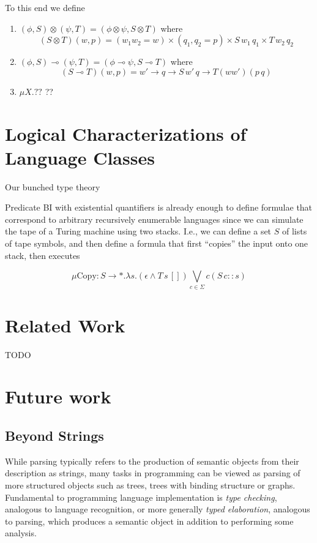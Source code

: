 \documentclass[sigconf,anonymous,review,screen]{acmart}
\newif\ifdraft
\newcommand{\pedro}[1]{\ifdraft{\color{red}[{\bf Pedro}: #1]}\fi}
\begin{document}
To this end we define
\pedro{I'm pretty sure that these definitions have been somewhat presented
  in ``Glueing and orthogonality for models of linear logic'' by Hyland and Schalk.
We should probably cite them so that we don't have to rederive their constructions and proofs here.}
\begin{enumerate}
\item $(\phi, S) \otimes (\psi, T) = (\phi \otimes \psi, S\otimes T)$ where
  \[ (S \otimes T)(w, p) = (w_1w_2 = w) \times (q_1,q_2 = p) \times S\,w_1\,q_1 \times T\,w_2\,q_2\]
\item $(\phi, S) \multimap (\psi, T) = (\phi \multimap \psi, S \multimap T)$ where
  \[ (S \multimap T)(w,p) = w' \to q \to S\,w'\,q \to T (ww') (p\,q) \]
\item $\mu X. ??$ ??
\end{enumerate}

\section{Logical Characterizations of Language Classes}

Our bunched type theory 

Predicate BI with existential quantifiers is already enough to define
formulae that correspond to arbitrary recursively enumerable languages
since we can simulate the tape of a Turing machine using two
stacks. I.e., we can define a set $S$ of lists of tape symbols, and
then define a formula that first ``copies'' the input onto one stack, then executes

\[ \mu \textrm{Copy} : S \to *. \lambda s. (\epsilon \wedge T\,s\,[])\bigvee_{c \in \Sigma} c (S\,{c::s}) \]


\section{Related Work}

TODO 


\section{Future work}

\subsection{Beyond Strings}

While parsing typically refers to the production of semantic objects
from their description as strings, many tasks in programming can be
viewed as parsing of more structured objects such as trees, trees with
binding structure or graphs. Fundamental to programming language
implementation is \emph{type checking}, analogous to language
recognition, or more generally \emph{typed elaboration}, analogous to
parsing, which produces a semantic object in addition to performing
some analysis.
\end{document}
